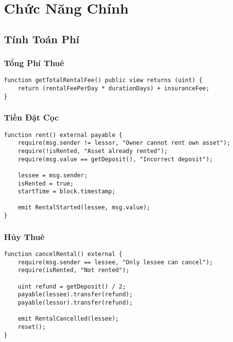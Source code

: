 \documentclass[12pt,a4paper]{article}
\begin{document}
\section{Chức Năng Chính}

\subsection{Tính Toán Phí}

\subsubsection{Tổng Phí Thuê}
\begin{lstlisting}[language=Solidity, caption=Tính tổng phí thuê xe]
function getTotalRentalFee() public view returns (uint) {
    return (rentalFeePerDay * durationDays) + insuranceFee;
}
\end{lstlisting}

\subsubsection{Tiền Đặt Cọc}
\begin{lstlisting}[language=Solidity, caption=Tính tiền đặt cọc (30% tổng phí)]
function getDeposit() public view returns (uint) {
    return (getTotalRentalFee() * 30) / 100;
}
\end{lstlisting}

\subsection{Quy Trình Thuê Xe}

\subsubsection{Bắt Đầu Thuê}
\begin{lstlisting}[language=Solidity, caption=Hàm bắt đầu thuê xe]
function rent() external payable {
    require(msg.sender != lessor, "Owner cannot rent own asset");
    require(!isRented, "Asset already rented");
    require(msg.value == getDeposit(), "Incorrect deposit");

    lessee = msg.sender;
    isRented = true;
    startTime = block.timestamp;

    emit RentalStarted(lessee, msg.value);
}
\end{lstlisting}

\subsubsection{Hủy Thuê}
\begin{lstlisting}[language=Solidity, caption=Hàm hủy thuê xe]
function cancelRental() external {
    require(msg.sender == lessee, "Only lessee can cancel");
    require(isRented, "Not rented");

    uint refund = getDeposit() / 2;
    payable(lessee).transfer(refund);
    payable(lessor).transfer(refund);

    emit RentalCancelled(lessee);
    reset();
}
\end{lstlisting}
\end{document}
